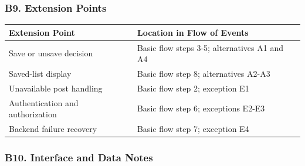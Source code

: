 \documentclass[12pt]{article}
\renewcommand{\baselinestretch}{1.5}
\begin{document}
\hypertarget{sec:b9-extension-points}{}
\subsubsection*{B9. Extension Points}
\par\medskip

\begingroup
\small
\renewcommand{\baselinestretch}{1.0}\selectfont
\renewcommand{\arraystretch}{1.15}
\setlength{\tabcolsep}{6pt}
\begin{longtable}{|>{\raggedright\arraybackslash}p{}|>{\raggedright\arraybackslash}p{}|}
\hline
\textbf{Extension Point} & \textbf{Location in Flow of Events} \\ \hline
\endhead
Save or unsave decision & Basic flow steps 3-5; alternatives A1 and A4 \\ \hline
Saved-list display & Basic flow step 8; alternatives A2-A3 \\ \hline
Unavailable post handling & Basic flow step 2; exception E1 \\ \hline
Authentication and authorization & Basic flow step 6; exceptions E2-E3 \\ \hline
Backend failure recovery & Basic flow step 7; exception E4 \\ \hline
\end{longtable}
\endgroup
\par\medskip

\hypertarget{sec:b10-interface-and-data-notes}{}
\subsubsection*{B10. Interface and Data Notes}
\par\medskip
\end{document}
